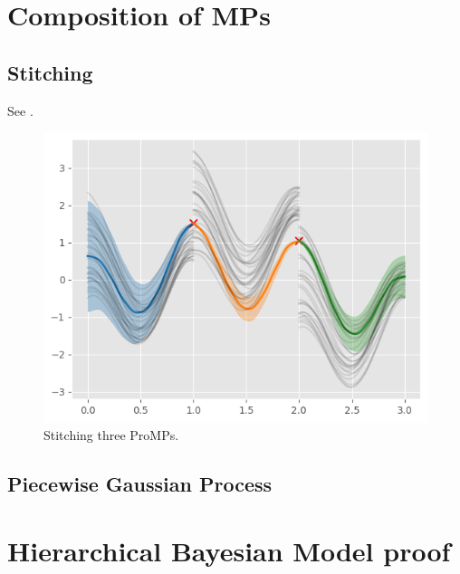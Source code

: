 \documentclass{article}
\begin{document}
\section{Composition of MPs}
\subsection{Stitching}
See .
\begin{figure}[htbp]
  \centering
  \includegraphics[width=0.5\linewidth]{fig/stitching.png}
  \caption{Stitching three ProMPs.}
  \label{fig:stitching}
\end{figure}

\subsection{Piecewise Gaussian Process}


\FloatBarrier




\appendix
\section{Hierarchical Bayesian Model proof}
\end{document}
